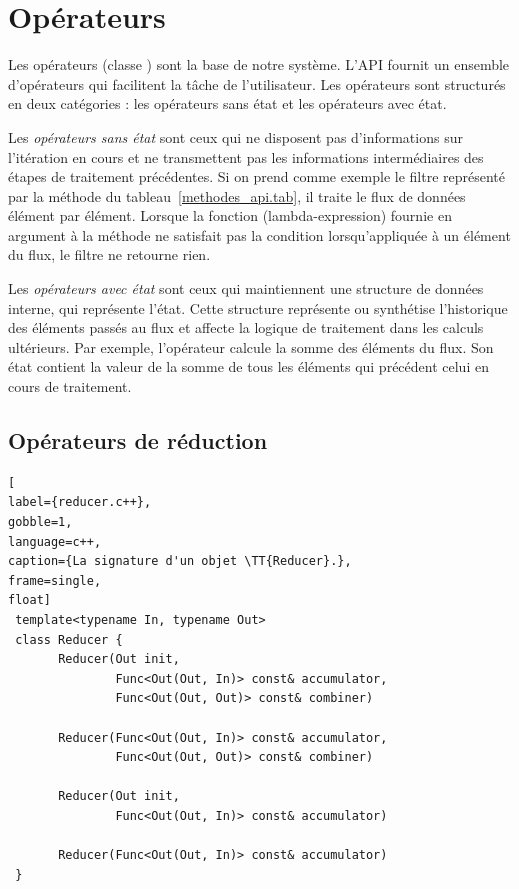 \section{Op\'erateurs}

Les op\'erateurs (classe ) sont la base de notre syst\`eme. L'API fournit un ensemble d'op\'erateurs qui facilitent la t\^ache de l'utilisateur. Les op\'erateurs sont structur\'es en deux cat\'egories : les op\'erateurs sans \'etat et les op\'erateurs avec \'etat.

Les \emph{op\'erateurs sans \'etat} sont ceux qui ne disposent pas d'informations sur l'it\'eration en cours et ne transmettent pas les informations interm\'ediaires des \'etapes de traitement pr\'ec\'edentes. Si on prend comme exemple le filtre repr\'esent\'e par la m\'ethode  du tableau~\ref{methodes_api.tab}, il traite le flux de donn\'ees \'el\'ement par \'el\'ement. 
%
Lorsque la fonction (lambda-expression) fournie en argument \`a la m\'ethode  ne satisfait pas la condition lorsqu'appliqu\'ee \`a un \'el\'ement du flux, le filtre ne retourne rien. 

Les \emph{op\'erateurs avec \'etat} sont ceux qui maintiennent une structure de donn\'ees interne, qui repr\'esente l'\'etat. Cette structure repr\'esente ou synth\'etise l'historique des \'el\'ements pass\'es au flux et affecte la logique de traitement dans les calculs ult\'erieurs. Par exemple, l'op\'erateur  calcule la somme des \'el\'ements du flux. Son \'etat contient la valeur de la somme de tous les \'el\'ements qui pr\'ec\'edent celui en cours de traitement. 

\subsection*{Op\'erateurs de r\'eduction}

\label{reducer.sect}

\begin{lstlisting}[
label={reducer.c++},
gobble=1,
language=c++,
caption={La signature d'un objet \TT{Reducer}.},
frame=single,
float]
 template<typename In, typename Out>
 class Reducer {
       Reducer(Out init, 
               Func<Out(Out, In)> const& accumulator,
               Func<Out(Out, Out)> const& combiner)

       Reducer(Func<Out(Out, In)> const& accumulator,
               Func<Out(Out, Out)> const& combiner)

       Reducer(Out init, 
               Func<Out(Out, In)> const& accumulator)

       Reducer(Func<Out(Out, In)> const& accumulator)
 }
\end{lstlisting}



